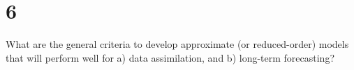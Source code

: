 \section{6}

What are the general criteria to develop approximate (or reduced-order) models that will perform well for a) data assimilation, and b) long-term forecasting?

